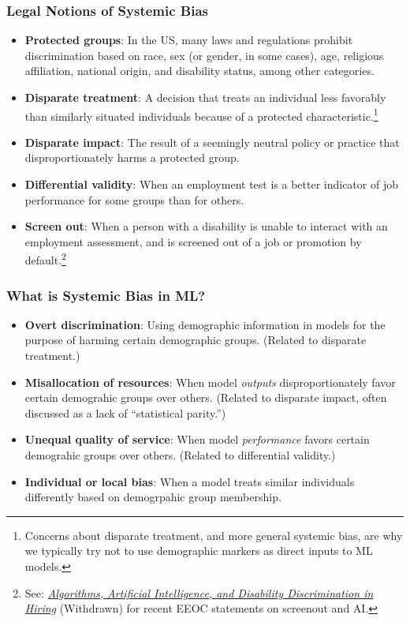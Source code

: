 \documentclass[11pt,aspectratio=169,hyperref={colorlinks}]{beamer}
\begin{document}
		\begin{frame}				
			
			\frametitle{Legal Notions of Systemic Bias}		
			
			\begin{itemize}\small
				\item \textbf{Protected groups}: In the US, many laws and regulations prohibit discrimination based on race, sex (or gender, in some cases), age, religious affiliation, national origin, and disability status, among other categories. 
				\item \textbf{Disparate treatment}: A decision that treats an individual less favorably than similarly situated individuals because of a protected characteristic.\footnote{Concerns about disparate treatment, and more general systemic bias, are why we typically try not to use demographic markers as direct inputs to ML models.}
				\item \textbf{Disparate impact}: The result of a seemingly neutral policy or practice that disproportionately harms a protected group. 
				\item \textbf{Differential validity}: When an employment test is a better indicator of job performance for some groups than for others.
				\item \textbf{Screen out}: When a person with a disability is unable to interact with an employment assessment, and is screened out of a job or promotion by default.\footnote{See: \href{https://web.archive.org/web/20221119025433/https://www.ada.gov/resources/ai-guidance/}{\textit{Algorithms, Artificial Intelligence, and Disability Discrimination in Hiring}} (Withdrawn) for recent EEOC statements on screenout and AI.} 
			\end{itemize}
		\end{frame}
		
		\begin{frame}				

			\frametitle{What is Systemic Bias in ML?}

				\begin{itemize}
					\item \textbf{Overt discrimination}: Using demographic information in models for the purpose of harming certain demographic groups. (Related to disparate treatment.)
					\item \textbf{Misallocation of resources}: When model \textit{outputs} disproportionately favor certain demograhic groups over others. (Related to disparate impact, often discussed as a lack of ``statistical parity.'') 
					\item \textbf{Unequal quality of service}:  When model \textit{performance} favors certain demograhic groups over others. (Related to differential validity.)
					\item \textbf{Individual or local bias}: When a model treats similar individuals differently based on demogrpahic group membership. 
				\end{itemize}

		\end{frame}
\end{document}
